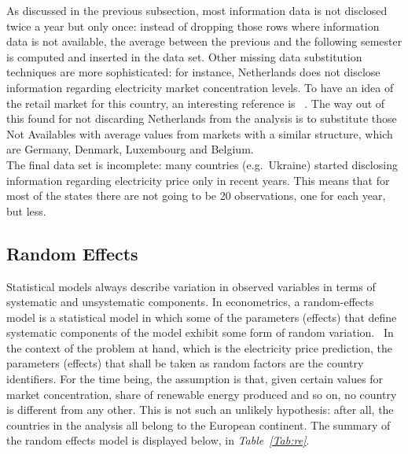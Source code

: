 \documentclass[a4paper,12pt]{book}
\begin{document}
As discussed in the previous subsection, most information data is not disclosed twice a year but only once: instead of dropping those rows where information data is not available, the average between the previous and the following semester is computed and inserted in the data set. Other missing data substitution techniques are more sophisticated: for instance, Netherlands does not disclose information regarding electricity market concentration levels. To have an idea of the retail market for this country, an interesting reference is ~\cite{mulder2019dutch}.  The way out of this found for not discarding Netherlands from the analysis is to substitute those Not Availables with average values from markets with a similar structure, which are Germany, Denmark, Luxembourg and Belgium.\\

The final data set is incomplete: many countries (e.g.\ Ukraine) started disclosing information regarding electricity price only in recent years. This means that for most of the states there are not going to be 20 observations, one for each year, but less.

\subsection{Random Effects}

Statistical models always describe variation in observed variables in terms of systematic and unsystematic components. In econometrics, a random-effects model is a statistical model in which some of the parameters (effects) that define systematic components of the model exhibit some form of random variation.~\cite{salkind2010encyclopedia} In the context of the problem at hand, which is the electricity price prediction, the parameters (effects) that shall be taken as random factors are the country identifiers. For the time being, the assumption is that, given certain values for market concentration, share of renewable energy produced and so on, no country is different from any other. This is not such an unlikely hypothesis: after all, the countries in the analysis all belong to the European continent. The summary of the random effects model is displayed below, in \textit{Table~\ref{Tab:re}}.
\end{document}
